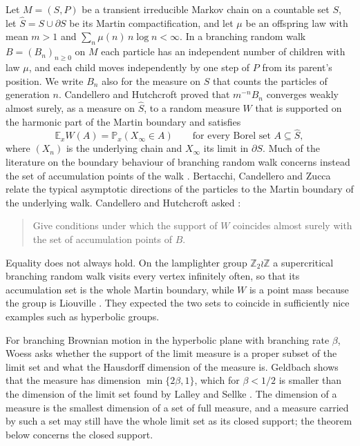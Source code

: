 \documentclass[11pt]{amsart}
\theoremstyle{definition}
\theoremstyle{remark}
\numberwithin{equation}{section}
\newcommand{\E}{\mathbb E}
\newcommand{\Pp}{\mathbb P}
\newcommand{\1}{\mathbf 1}
\newcommand{\K}{\widehat S}
\newcommand{\bd}{\partial S}
\begin{document}
Let $M=(S,P)$ be a transient irreducible Markov chain on a countable set $S$, let $\K=S\cup\bd$ be its Martin compactification, and let $\mu$ be an offspring law with mean $m>1$ and $\sum_n\mu(n)\,n\log n<\infty$. In a branching random walk $B=(B_n)_{n\ge0}$ on $M$ each particle has an independent number of children with law $\mu$, and each child moves independently by one step of $P$ from its parent's position. We write $B_n$ also for the measure on $S$ that counts the particles of generation $n$. Candellero and Hutchcroft \cite[Theorem~1.1]{CH} proved that $m^{-n}B_n$ converges weakly almost surely, as a measure on $\K$, to a random measure $W$ that is supported on the harmonic part of the Martin boundary and satisfies
\begin{equation}\label{eq:mean}
\E_xW(A)=\Pp_x(X_\infty\in A)\qquad\text{for every Borel set }A\subseteq\K,
\end{equation}
where $(X_n)$ is the underlying chain and $X_\infty$ its limit in $\bd$. Much of the literature on the boundary behaviour of branching random walk concerns instead the set of accumulation points of the walk \cite{LS,Lig,HL,CGM,SWX,DWY}. Bertacchi, Candellero and Zucca \cite{BCZ} relate the typical asymptotic directions of the particles to the Martin boundary of the underlying walk. Candellero and Hutchcroft asked \cite[Problem~4.2]{CH}:
\begin{quote}
Give conditions under which the support of $W$ coincides almost surely with the set of accumulation points of $B$.
\end{quote}
Equality does not always hold. On the lamplighter group $\mathbb Z_2\wr\mathbb Z$ a supercritical branching random walk visits every vertex infinitely often, so that its accumulation set is the whole Martin boundary, while $W$ is a point mass because the group is Liouville \cite[Section~4]{CH}. They expected the two sets to coincide in sufficiently nice examples such as hyperbolic groups.

For branching Brownian motion in the hyperbolic plane with branching rate $\beta$, Woess \cite[Questions~7.6]{Woe24} asks whether the support of the limit measure is a proper subset of the limit set and what the Hausdorff dimension of the measure is. Geldbach \cite{Gel} shows that the measure has dimension $\min\{2\beta,1\}$, which for $\beta<1/2$ is smaller than the dimension of the limit set found by Lalley and Sellke \cite{LS}. The dimension of a measure is the smallest dimension of a set of full measure, and a measure carried by such a set may still have the whole limit set as its closed support; the theorem below concerns the closed support.
\end{document}

